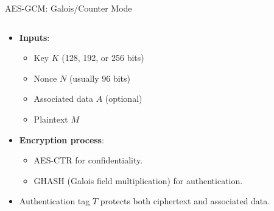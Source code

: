 \documentclass[aspectratio=169, lualatex, handout]{beamer}
\begin{document}
\begin{frame}{AES-GCM: Galois/Counter Mode}
	\begin{columns}[c]
		\begin{column}{0.5\textwidth}
			\begin{itemize}
				\item \textbf{Inputs}:
				      \begin{itemize}
					      \item Key $K$ (128, 192, or 256 bits)
					      \item Nonce $N$ (usually 96 bits)
					      \item Associated data $A$ (optional)
					      \item Plaintext $M$
				      \end{itemize}
				\item \textbf{Encryption process}:
				      \begin{itemize}
					      \item AES-CTR for confidentiality.
					      \item GHASH (Galois field multiplication) for authentication.
				      \end{itemize}
				\item Authentication tag $T$ protects both ciphertext and associated data.
			\end{itemize}
		\end{column}
		\begin{column}{0.5\textwidth}
		\end{column}
	\end{columns}
\end{frame}
\end{document}
